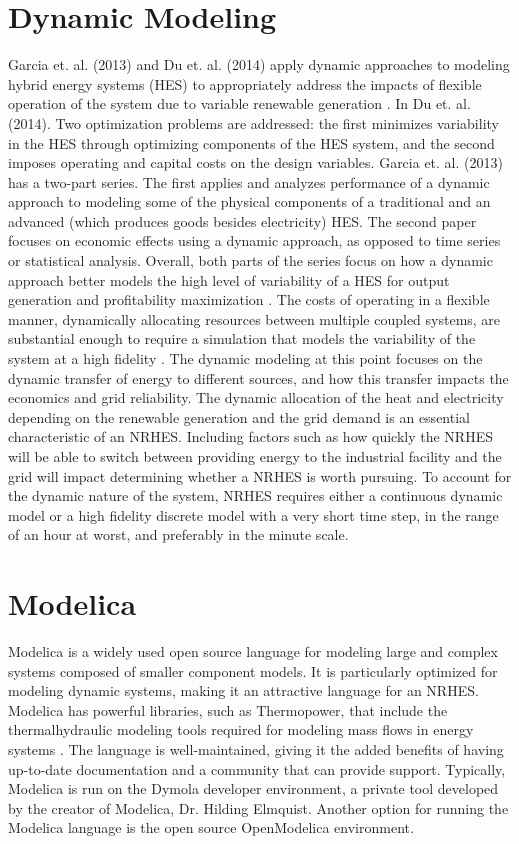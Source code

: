 \documentclass[12pt]{UIdahoMastersThesis}
\begin{document}
\section{Dynamic Modeling}
Garcia et. al. (2013) and Du et. al. (2014) apply dynamic approaches to modeling hybrid energy systems (HES) to appropriately address the impacts of flexible operation of the system due to variable renewable generation \cite{Garcia2013, Du2014}. In Du et. al. (2014). Two optimization problems are addressed: the first minimizes variability in the HES through optimizing components of the HES system, and the second imposes operating and capital costs on the design variables. Garcia et. al. (2013) has a two-part series. The first applies and analyzes performance of a dynamic approach to modeling some of the physical components of a traditional and an advanced (which produces goods besides electricity) HES. The second paper focuses on economic effects using a dynamic approach, as opposed to time series or statistical analysis. Overall, both parts of the series focus on how a dynamic approach better models the high level of variability of a HES for output generation and profitability maximization \cite{Garcia2013}.
The costs of operating in a flexible manner, dynamically allocating resources between multiple coupled systems, are substantial enough to require a simulation that models the variability of the system at a high fidelity \cite{Garcia2013, Shropshire2011, Locatelli2015}. The dynamic modeling at this point focuses on the dynamic transfer of energy to different sources, and how this transfer impacts the economics and grid reliability. The dynamic allocation of the heat and electricity depending on the renewable generation and the grid demand is an essential characteristic of an NRHES.  Including factors such as how quickly the NRHES will be able to switch between providing energy to the industrial facility and the grid will impact determining whether a NRHES is worth pursuing.  To account for the dynamic nature of the system, NRHES requires either a continuous dynamic model or a high fidelity discrete  model with a very short time step, in the range of an hour at worst, and preferably in the minute scale.
\section{Modelica}
Modelica is a widely used open source language for modeling large and complex systems composed of smaller component models. It is particularly optimized for modeling dynamic systems, making it an attractive language for an NRHES. Modelica has powerful libraries, such as Thermopower, that include the thermalhydraulic modeling tools required for modeling mass flows in energy systems \cite{Binder2014}. The language is well-maintained, giving it the added benefits of having up-to-date documentation and a community that can provide support. Typically, Modelica is run on the Dymola developer environment, a private tool developed by the creator of Modelica, Dr. Hilding Elmquist. Another option for running the Modelica language is the open source OpenModelica environment.
\end{document}
